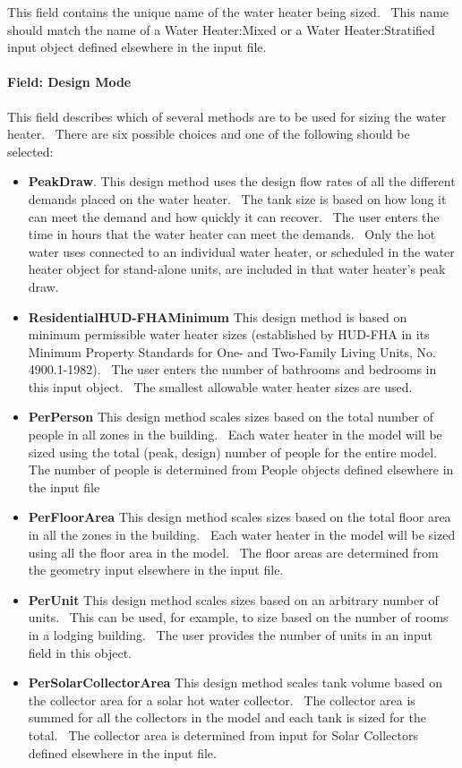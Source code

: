 This field contains the unique name of the water heater being sized.~ This name should match the name of a Water Heater:Mixed or a Water Heater:Stratified input object defined elsewhere in the input file.

\paragraph{Field: Design Mode}\label{field-design-mode}

This field describes which of several methods are to be used for sizing the water heater.~ There are six possible choices and one of the following should be selected:

\begin{itemize}
\item
  \textbf{PeakDraw}. This design method uses the design flow rates of all the different demands placed on the water heater.~ The tank size is based on how long it can meet the demand and how quickly it can recover.~ The user enters the time in hours that the water heater can meet the demands.~ Only the hot water uses connected to an individual water heater, or scheduled in the water heater object for stand-alone units, are included in that water heater's peak draw.
\item
  \textbf{ResidentialHUD-FHAMinimum} This design method is based on minimum permissible water heater sizes (established by HUD-FHA in its Minimum Property Standards for One- and Two-Family Living Units, No. 4900.1-1982).~ The user enters the number of bathrooms and bedrooms in this input object.~ The smallest allowable water heater sizes are used.
\item
  \textbf{PerPerson} This design method scales sizes based on the total number of people in all zones in the building.~ Each water heater in the model will be sized using the total (peak, design) number of people for the entire model.~ The number of people is determined from People objects defined elsewhere in the input file
\item
  \textbf{PerFloorArea} This design method scales sizes based on the total floor area in all the zones in the building.~ Each water heater in the model will be sized using all the floor area in the model.~ The floor areas are determined from the geometry input elsewhere in the input file.
\item
  \textbf{PerUnit} This design method scales sizes based on an arbitrary number of units.~ This can be used, for example, to size based on the number of rooms in a lodging building.~ The user provides the number of units in an input field in this object.
\item
  \textbf{PerSolarCollectorArea} This design method scales tank volume based on the collector area for a solar hot water collector.~ The collector area is summed for all the collectors in the model and each tank is sized for the total.~ The collector area is determined from input for Solar Collectors defined elsewhere in the input file.
\end{itemize}

